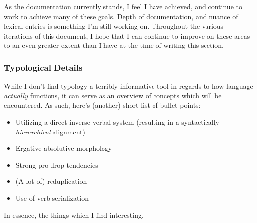 As the documentation currently stands, I feel I have achieved, and continue to work to achieve many of these goals. Depth of documentation, and nuance of lexical entries is something I'm still working on. Throughout the various iterations of this document, I hope that I can continue to improve on these areas to an even greater extent than I have at the time of writing this section.\footnotemark

\subsubsection{Typological Details}
While I don't find typology a terribly informative tool in regards to how language \textit{actually} functions, it can serve as an overview of concepts which will be encountered. As such, here's (another) short list of bullet points:

\begin{itemize}
  \item Utilizing a direct-inverse verbal system (resulting in a syntactically \textit{hierarchical} alignment)
  \item Ergative-absolutive morphology
  \item Strong pro-drop tendencies
  \item (A lot of) reduplication
  \item Use of verb serialization
\end{itemize}

In essence, the things which I find interesting.
